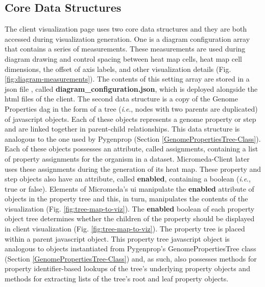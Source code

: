 \subsection{Core Data Structures} \label{visual-data-structures}

The client visualization page uses two core data structures and they are both 
accessed during visualization generation. One is a diagram configuration array 
that contains a series of measurements. These measurements are used during 
diagram drawing and control spacing between heat map cells, heat map cell 
dimensions, the offset of axis labels, and other visualization details (Fig. 
\ref{fig:diagram-measurements}). The contents of this setting array are stored 
in a \gls{json} file \cite{bray2014rfc}, called 
\textbf{diagram\_configuration.json}, which is deployed alongside the \gls{html} 
files of the client. The second data structure is a copy of the Genome 
Properties \gls{dag} in the form of a tree (\textit{i}.\textit{e}., nodes with 
two parents are duplicated) of \gls{javascript} objects. Each of these objects 
represents a genome property or step and are linked together in parent-child 
relationships. This data structure is analogous to the one used by Pygenprop 
(Section \ref{GenomePropertiesTree-Class}). Each of these objects possesses an 
attribute, called assignments, containing a list of property assignments for the 
organism in a dataset. Micromeda-Client later uses these assignments during the 
generation of its heat map. These property and step objects also have an 
attribute, called \textbf{enabled}, containing a boolean 
(\textit{i}.\textit{e}., true or false). Elements of Micromeda's \gls{ui} 
manipulate the \textbf{enabled} attribute of objects in the property tree and 
this, in turn, manipulates the contents of the visualization (Fig. 
\ref{fig:tree-map-to-viz}). The \textbf{enabled} boolean of each property object 
tree determines whether the children of the property should be displayed in 
client visualization (Fig. \ref{fig:tree-map-to-viz}). The property tree is 
placed within a parent \gls{javascript} object. This property tree 
\gls{javascript} object is analogous to objects instantiated from Pygenprop's 
GenomePropertiesTree class (Section \ref{GenomePropertiesTree-Class}) and, as 
such, also possesses methods for property identifier-based lookups of the tree's 
underlying property objects and methods for extracting lists of the tree's root 
and leaf property objects.

